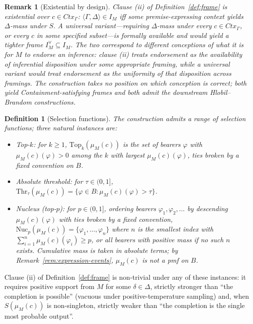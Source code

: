 \documentclass[11pt]{article}
\newtheorem{definition}{Definition}
\newtheorem{remark}{Remark}
\begin{document}
\begin{remark}[Existential by design]
Clause (ii) of Definition~\ref{def:frame} is existential over $c \in \mathit{Ctx}_\Gamma$: $\langle \Gamma, \Delta \rangle \in I_M$ iff \emph{some} premise-expressing context yields $\Delta$-mass under $S$. A universal variant---requiring $\Delta$-mass under every $c \in \mathit{Ctx}_\Gamma$, or every $c$ in some specified subset---is formally available and would yield a tighter frame $I_M^\forall \subseteq I_M$. The two correspond to different conceptions of what it is for $M$ to endorse an inference: clause (ii) treats endorsement as the \emph{availability} of inferential disposition under some appropriate framing, while a universal variant would treat endorsement as the \emph{uniformity} of that disposition across framings. The construction takes no position on which conception is correct; both yield Containment-satisfying frames and both admit the downstream Hlobil--Brandom constructions. 
\end{remark}

\begin{definition}[Selection functions]
\label{def:selection}
The construction admits a range of selection functions; three natural instances are:
\begin{itemize}
\item \emph{Top-$k$}: for $k \geq 1$, $\mathrm{Top}_k(\mu_M(c))$ is the set of bearers $\varphi$ with $\mu_M(c)(\varphi) > 0$ among the $k$ with largest $\mu_M(c)(\varphi)$, ties broken by a fixed convention on $B$.
\item \emph{Absolute threshold}: for $\tau \in (0, 1]$, $\mathrm{Thr}_\tau(\mu_M(c)) = \{\varphi \in B : \mu_M(c)(\varphi) > \tau\}$.
\item \emph{Nucleus} (top-$p$): for $p \in (0, 1]$, ordering bearers $\varphi_1, \varphi_2, \ldots$ by descending $\mu_M(c)(\varphi)$ with ties broken by a fixed convention, $\mathrm{Nuc}_p(\mu_M(c)) = \{\varphi_1, \ldots, \varphi_n\}$ where $n$ is the smallest index with $\sum_{i=1}^n \mu_M(c)(\varphi_i) \geq p$, or all bearers with positive mass if no such $n$ exists. Cumulative mass is taken in absolute terms; by Remark~\ref{rem:expression-events}, $\mu_M(c)$ is not a pmf on $B$.
\end{itemize}
\end{definition}

Clause (ii) of Definition~\ref{def:frame} is non-trivial under any of these instances: it requires positive support from $M$ for some $\delta \in \Delta$, strictly stronger than ``the completion is possible'' (vacuous under positive-temperature sampling) and, when $S(\mu_M(c))$ is non-singleton, strictly weaker than ``the completion is the single most probable output''.
\end{document}
